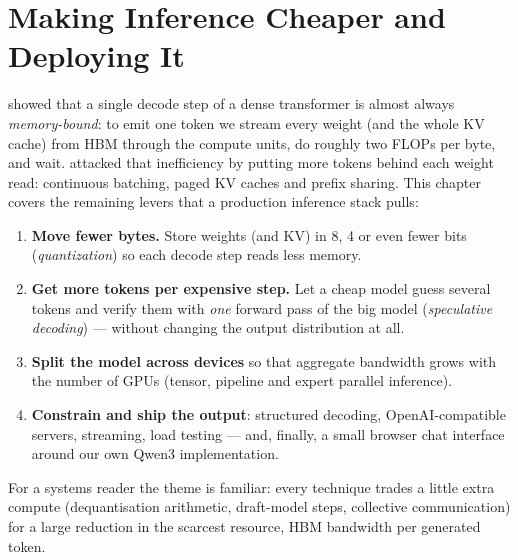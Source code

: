 \chapter{Making Inference Cheaper and Deploying It}\label{ch:efficient}

 showed that a single decode step of a dense transformer is almost
always \emph{memory-bound}: to emit one token we stream every weight (and the whole KV
cache) from HBM through the compute units, do roughly two FLOPs per byte, and wait.
 attacked that inefficiency by putting more tokens behind each weight
read: continuous batching, paged KV caches and prefix sharing. This chapter covers the
remaining levers that a production inference stack pulls:
\begin{enumerate}
  \item \textbf{Move fewer bytes.} Store weights (and KV) in 8, 4 or even fewer bits
        (\emph{quantization}) so each decode step reads less memory.
  \item \textbf{Get more tokens per expensive step.} Let a cheap model guess several tokens
        and verify them with \emph{one} forward pass of the big model (\emph{speculative
        decoding}) --- without changing the output distribution at all.
  \item \textbf{Split the model across devices} so that aggregate bandwidth grows with the
        number of GPUs (tensor, pipeline and expert parallel inference).
  \item \textbf{Constrain and ship the output}: structured decoding, OpenAI-compatible
        servers, streaming, load testing --- and, finally, a small browser chat interface
        around our own Qwen3 implementation.
\end{enumerate}
For a systems reader the theme is familiar: every technique trades a little extra compute
(dequantisation arithmetic, draft-model steps, collective communication) for a large
reduction in the scarcest resource, HBM bandwidth per generated token.

